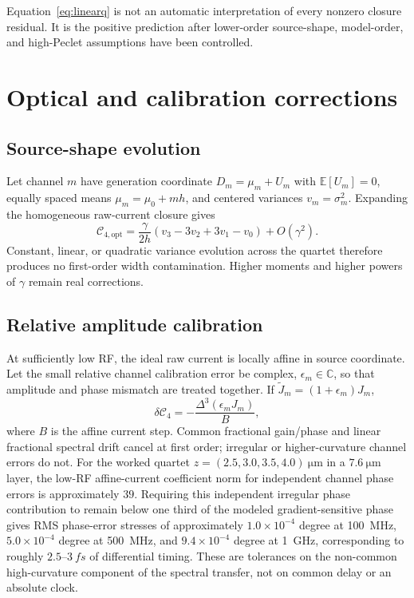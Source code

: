 \documentclass[11pt]{article}
\newcommand{\Cfour}{\mathcal{C}_4}
\newcommand{\E}{\mathbb{E}}
\begin{document}
Equation~\eqref{eq:linearq} is not an automatic interpretation of every nonzero closure residual. It is the positive prediction after lower-order source-shape, model-order, and high-Peclet assumptions have been controlled.

\section{Optical and calibration corrections}

\subsection{Source-shape evolution}

Let channel $m$ have generation coordinate $D_m=\mu_m+U_m$ with $\E[U_m]=0$, equally spaced means $\mu_m=\mu_0+mh$, and centered variances $v_m=\sigma_m^2$. Expanding the homogeneous raw-current closure gives
\begin{equation}
\boxed{
\mathcal{C}_{4,\mathrm{opt}}
=\frac{\gamma}{2h}(v_3-3v_2+3v_1-v_0)+O(\gamma^2).}
\label{eq:opticalerror}
\end{equation}
Constant, linear, or quadratic variance evolution across the quartet therefore produces no first-order width contamination. Higher moments and higher powers of $\gamma$ remain real corrections.

\subsection{Relative amplitude calibration}

At sufficiently low RF, the ideal raw current is locally affine in source coordinate. Let the small relative channel calibration error be complex, $\epsilon_m\in\mathbb C$, so that amplitude and phase mismatch are treated together. If $\widetilde J_m=(1+\epsilon_m)J_m$,
\begin{equation}
\boxed{
\delta\Cfour=-\frac{\Delta^3(\epsilon_mJ_m)}{B},}
\label{eq:ampcal}
\end{equation}
where $B$ is the affine current step. Common fractional gain/phase and linear fractional spectral drift cancel at first order; irregular or higher-curvature channel errors do not. For the worked quartet $z=(2.5,3.0,3.5,4.0)~\si{\micro\meter}$ in a $7.6~\si{\micro\meter}$ layer, the low-RF affine-current coefficient norm for independent channel phase errors is approximately $39$. Requiring this independent irregular phase contribution to remain below one third of the modeled gradient-sensitive phase gives RMS phase-error stresses of approximately $1.0\times10^{-4}$ degree at \SI{100}{MHz}, $5.0\times10^{-4}$ degree at \SI{500}{MHz}, and $9.4\times10^{-4}$ degree at \SI{1}{GHz}, corresponding to roughly $2.5$--$3~\si{fs}$ of differential timing. These are tolerances on the non-common high-curvature component of the spectral transfer, not on common delay or an absolute clock.
\end{document}
